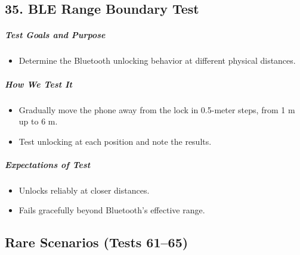 \subsection*{35. BLE Range Boundary Test}
\subparagraph{Test Goals and Purpose}
\begin{itemize}
    \item Determine the Bluetooth unlocking behavior at different physical distances.
\end{itemize}
\subparagraph{How We Test It}
\begin{itemize}
    \item Gradually move the phone away from the lock in 0.5-meter steps, from 1 m up to 6 m.
    \item Test unlocking at each position and note the results.
\end{itemize}
\subparagraph{Expectations of Test}
\begin{itemize}
    \item Unlocks reliably at closer distances.
    \item Fails gracefully beyond Bluetooth’s effective range.
\end{itemize}










































\newpage
\subsection{Rare Scenarios (Tests 61–65)}

